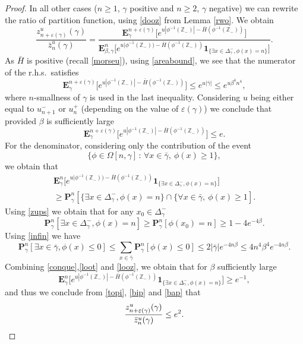\documentclass[JEP,XML,SOM,Unicode, NoFloatCountersInSection]{cedram}
\newcommand{\sep}{\,:\,}
\numberwithin{equation}{section}
\theoremstyle{plain}
\theoremstyle{definition}
\newcommand{\ind}{\mathbf{1}}
\newcommand{\bP}{{\ensuremath{\mathbf P}} }
\newcommand{\bE}{{\ensuremath{\mathbf E}} }
\newcommand{\bbZ}{{\ensuremath{\mathbb Z}} }
\newcommand{\gb}{\beta}
\newcommand{\gep}{\varepsilon}
\newcommand{\gO}{\Omega}
\begin{document}
\begin{proof}
In all other cases ($n\ge 1$, $\gamma$ positive and $n\ge 2$, $\gamma$ negative)
we can rewrite the ratio of partition function, using \eqref{dooz} from Lemma \ref{rwo}. We obtain
\begin{equation}\label{topi}
\frac{z^u_{n+\gep(\gamma)}(\gamma)}{ \bar z^u_n(\gamma)}
= \frac{ \bE^{n+\gep(\gamma)}_{\gamma}\bigl[e^{u |\phi^{-1} (\bbZ_-)| -\bar H(\phi^{-1}(\bbZ_-))}\bigr]}{\bE^n_{\gb,\gamma}\bigl[e^{u |\phi^{-1}(\bbZ_-))-\bar H(\phi^{-1}(\bbZ_-))}\ind_{\{ \exists x\in \Delta^-_{\gamma},\phi(x)=n\}}\bigr]}.
\end{equation}
As $\bar H$ is positive (recall \eqref{morseu}), using \eqref{areabound}, we see that the numerator of the r.h.s.\ satisfies
\begin{equation*}%
\bE^{n+\gep(\gamma)}_{\gamma}\bigl[e^{u |\phi^{-1} (\bbZ_-)| -\bar H(\phi^{-1}(\bbZ_-))}\bigr] \le e^{u|\bar \gamma|}\le e^{u \gb^4n^4},
\end{equation*}
where $n$-smallness of $\gamma$ is used in the last inequality.
Considering $u$ being either equal to $u^-_{n+1}$ or $u^+_n$ (depending on the value of $\gep(\gamma)$) we conclude that provided $\gb$ is sufficiently large
\begin{equation}\label{bip}
\bE^{n+\gep(\gamma)}_{\gamma}\bigl[e^{u |\phi^{-1} (\bbZ_-)| -\bar H(\phi^{-1}(\bbZ_-))}\bigr]\le e.
\end{equation}
For the denominator,
considering only the contribution of the event
\[
\{\phi \in \gO[n,\gamma] \sep \forall x\in \bar \gamma,\ \phi(x)\ge 1\},
\]
we obtain that
\begin{multline}\label{conque}
\bE^n_{\gamma}\bigl[e^{u |\phi^{-1}(\bbZ_-))-\bar H(\phi^{-1}(\bbZ_-))}\ind_{\{\exists x\in \Delta^-_{\gamma},\phi(x)=n\}}\bigr]\\
\ge
\bP^n_{\gamma}\left[\{\exists x\in \Delta^-_{\gamma},\phi(x)=n\}\cap \{\forall x\in \bar \gamma,\ \phi(x)\ge 1 \right].
\end{multline}
Using \eqref{zups} we obtain that for any $x_0\in \Delta^-_{\gamma}$
\begin{equation}\label{loot}
\bP^n_{\gamma}\left[\exists x\in \Delta^-_{\gamma},\phi(x)=n \right]\ge \bP^n_{\gamma}\left[\phi(x_0)=n\right]\ge 1-4e^{-4\gb}.
\end{equation}
Using \eqref{infin} we have
\begin{equation}\label{looz}
\bP^n_{\gamma} \left[ \exists x\in \bar \gamma, \phi(x)\le 0 \right]
\le \sum_{x\in \bar \gamma} \bP^n_{\gamma} [ \phi(x)\le 0]\le 2|\bar \gamma| e^{-4n\gb}\le 4n^4\gb^4 e^{-4n\gb}.
\end{equation}
Combining \eqref{conque},\eqref{loot} and \eqref{looz}, we obtain that for $\gb$ sufficiently large
\begin{equation}\label{bap}
\bE^n_{\gamma}\bigl[e^{u |\phi^{-1}(\bbZ_-)|-\bar H(\phi^{-1}(\bbZ_-))}\ind_{\{\exists x\in \Delta^-_{\gamma},\phi(x)=n\}}\bigr]\ge e^{-1},
\end{equation}
and thus we conclude from \eqref{topi}, \eqref{bip} and \eqref{bap} that
\[
\frac{z^u_{n+\gep(\gamma)}(\gamma)}{\bar z^u_n(\gamma)}\le e^2.\qedhere
\]
\end{proof}
\end{document}
